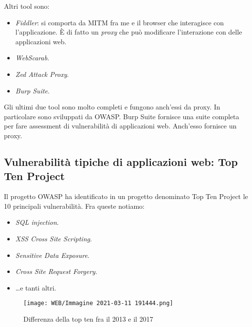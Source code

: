 \documentclass[14pt]{extreport}
\begin{document}
Altri tool sono:


\begin{itemize}
    \item \textit{Fiddler}: si comporta da MITM fra me e il browser che interagisce con l'applicazione. È di fatto un \textit{proxy} che può modificare l'interazione con delle applicazioni web.
    
    
    \item \textit{WebScarab}.
    
    
    \item \textit{Zed Attack Proxy}.
    
    \item \textit{Burp Suite}.
\end{itemize}

Gli ultimi due tool sono molto completi e fungono anch'essi da proxy. In particolare sono sviluppati da OWASP.
Burp Suite fornisce una suite completa per fare assessment di vulnerabilità di applicazioni web. Anch'esso fornisce un proxy.



\subsection{Vulnerabilità tipiche di applicazioni web: Top Ten Project}

Il progetto OWASP ha identificato in un progetto denominato Top Ten Project le 10 principali vulnerabilità. Fra queste notiamo:


\begin{itemize}
    \item \textit{SQL injection}.
    
    \item \textit{XSS Cross Site Scripting}.
    
    \item \textit{Sensitive Data Exposure}.
    
    \item \textit{Cross Site Request Forgery}.
    
    \item \ldots e tanti altri.
\end{itemize}



\begin{figure}[H]
    \centering
    \texttt{[image: WEB/Immagine 2021-03-11 191444.png]}
    \caption{Differenza della top ten fra il 2013 e il 2017}
\end{figure}
\end{document}
